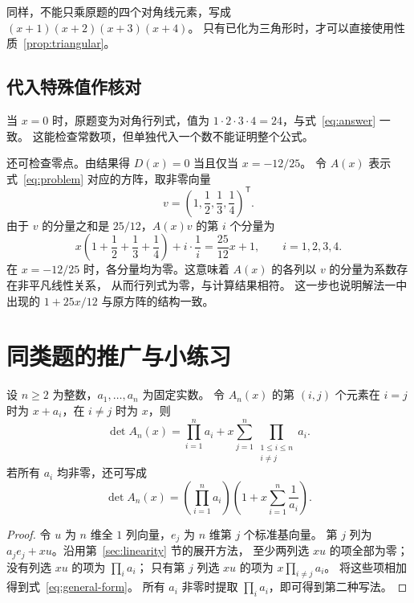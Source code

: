 \documentclass[UTF8,12pt,a4paper,fontset=fandol]{ctexart}
\begin{document}
同样，不能只乘原题的四个对角线元素，写成 $(x+1)(x+2)(x+3)(x+4)$。
只有已化为三角形时，才可以直接使用性质~\ref{prop:triangular}。

\subsection{代入特殊值作核对}

当 $x=0$ 时，原题变为对角行列式，值为 $1\cdot2\cdot3\cdot4=24$，与式~\eqref{eq:answer} 一致。
这能检查常数项，但单独代入一个数不能证明整个公式。

还可检查零点。由结果得 $D(x)=0$ 当且仅当 $x=-12/25$。
令 $A(x)$ 表示式~\eqref{eq:problem} 对应的方阵，取非零向量
\[
  v=\left(1,\frac12,\frac13,\frac14\right)^{\mathsf T}.
\]
由于 $v$ 的分量之和是 $25/12$，$A(x)v$ 的第 $i$ 个分量为
\[
  x\left(1+\frac12+\frac13+\frac14\right)+i\cdot\frac1i
  =\frac{25}{12}x+1,\qquad i=1,2,3,4.
\]
在 $x=-12/25$ 时，各分量均为零。这意味着 $A(x)$ 的各列以 $v$ 的分量为系数存在非平凡线性关系，
从而行列式为零，与计算结果相符。
这一步也说明解法一中出现的 $1+25x/12$ 与原方阵的结构一致。

\section{同类题的推广与小练习}

\begin{proposition}[非对角元素相同的情形]
\label{prop:general-form}
设 $n\geq2$ 为整数，$a_1,\ldots,a_n$ 为固定实数。
令 $A_n(x)$ 的第 $(i,j)$ 个元素在 $i=j$ 时为 $x+a_i$，在 $i\ne j$ 时为 $x$，则
\begin{equation}
  \det A_n(x)=\prod_{i=1}^n a_i
    +x\sum_{j=1}^n\prod_{\substack{1\leq i\leq n\\i\ne j}}a_i.
  \label{eq:general-form}
\end{equation}
若所有 $a_i$ 均非零，还可写成
\[
  \det A_n(x)=\left(\prod_{i=1}^n a_i\right)
  \left(1+x\sum_{i=1}^n\frac1{a_i}\right).
\]
\end{proposition}

\begin{proof}
令 $u$ 为 $n$ 维全 $1$ 列向量，$e_j$ 为 $n$ 维第 $j$ 个标准基向量。
第 $j$ 列为 $a_je_j+xu$。沿用第~\ref{sec:linearity} 节的展开方法，
至少两列选 $xu$ 的项全部为零；没有列选 $xu$ 的项为 $\prod_i a_i$；
只有第 $j$ 列选 $xu$ 的项为 $x\prod_{i\ne j}a_i$。
将这些项相加得到式~\eqref{eq:general-form}。
所有 $a_i$ 非零时提取 $\prod_i a_i$，即可得到第二种写法。
\end{proof}
\end{document}
